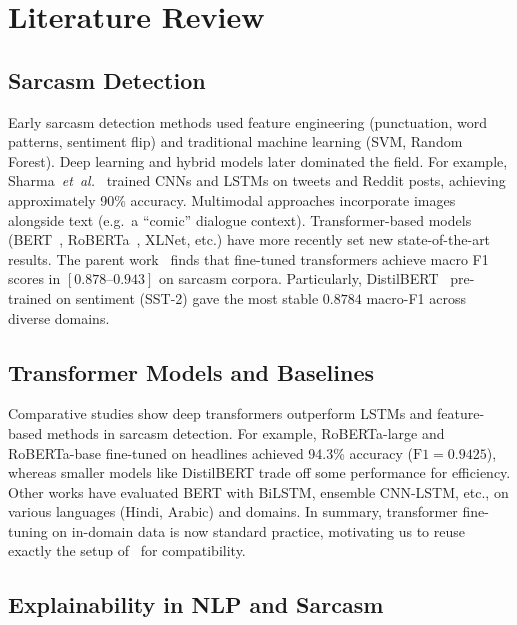 
\section{Literature Review}\label{sec:literature_review}

\subsection{Sarcasm Detection}\label{subsec:sarcasm_detection}

Early sarcasm detection methods used feature engineering (punctuation, word patterns, sentiment flip) and traditional machine learning (SVM, Random Forest). Deep learning and hybrid models later dominated the field. For example, Sharma~\emph{et~al.}~\cite{sharma2020deep} trained CNNs and LSTMs on tweets and Reddit posts, achieving approximately 90\% accuracy. Multimodal approaches incorporate images alongside text (e.g.\ a ``comic'' dialogue context). Transformer-based models (BERT~\cite{devlin2019bert}, RoBERTa~\cite{liu2019roberta}, XLNet, etc.) have more recently set new state-of-the-art results. The parent work~\cite{oprea2025llm} finds that fine-tuned transformers achieve macro F1 scores in $[0.878\text{--}0.943]$ on sarcasm corpora. Particularly, DistilBERT~\cite{sanh2019distilbert} pre-trained on sentiment (SST-2) gave the most stable $0.8784$ macro-F1 across diverse domains.

\subsection{Transformer Models and Baselines}\label{subsec:transformer_baselines}

Comparative studies show deep transformers outperform LSTMs and feature-based methods in sarcasm detection. For example, RoBERTa-large and RoBERTa-base fine-tuned on headlines achieved 94.3\% accuracy ($\text{F1} = 0.9425$), whereas smaller models like DistilBERT trade off some performance for efficiency. Other works have evaluated BERT with BiLSTM, ensemble CNN-LSTM, etc., on various languages (Hindi, Arabic) and domains. In summary, transformer fine-tuning on in-domain data is now standard practice, motivating us to reuse exactly the setup of~\cite{oprea2025llm} for compatibility.

\subsection{Explainability in NLP and Sarcasm}\label{subsec:xai_nlp}

